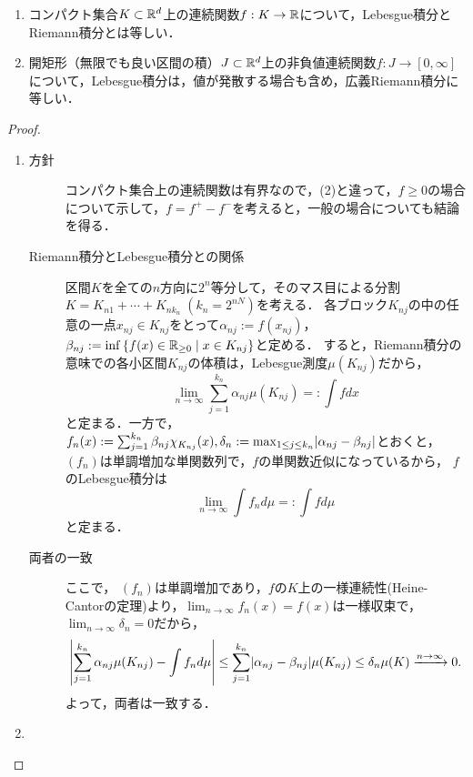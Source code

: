\documentclass[uplatex, dvipdfmx]{jsreport}
\begin{document}
\begin{theorem}[連続関数の積分]\mbox{}\label{thm-Lebesgue-integral-of-continuous-function}
    \begin{enumerate}
        \item コンパクト集合$K\subset\mathbb{R}^d$上の連続関数$f:K\to\mathbb{R}$について，Lebesgue積分とRiemann積分とは等しい．
        \item 開矩形（無限でも良い区間の積）$J\subset\mathbb{R}^d$上の非負値連続関数$f:J\to[0,\infty]$について，Lebesgue積分は，値が発散する場合も含め，広義Riemann積分に等しい．
    \end{enumerate}
\end{theorem}
\begin{proof}\mbox{}
    \begin{enumerate}
        \item \begin{description}
            \item[方針] コンパクト集合上の連続関数は有界なので，(2)と違って，$f\ge 0$の場合について示して，$f=f^+-f^-$を考えると，一般の場合についても結論を得る．
            \item[Riemann積分とLebesgue積分との関係]
            区間$K$を全ての$n$方向に$2^n$等分して，そのマス目による分割$K=K_{n1}+\cdots+K_{nk_n}\;(k_n=2^{nN})$を考える．
            各ブロック$K_{nj}$の中の任意の一点$x_{nj}\in K_{nj}$をとって$\alpha_{nj}:=f(x_{nj})$，$\beta_{nj}:=\inf\left\{f(x)\in\mathbb{R}_{\ge0}\mid x\in K_{nj}\right\}$と定める．
            すると，Riemann積分の意味での各小区間$K_{nj}$の体積は，Lebesgue測度$\mu(K_{nj})$だから，
            \[\lim_{n\to\infty}\sum_{j=1}^{k_n}\alpha_{nj}\mu(K_{nj})=:\int fdx\]
            と定まる．一方で，
            $f_n(x):=\sum_{j=1}^{k_n}\beta_{nj}\chi_{K_{nj}}(x),\delta_n:=\max_{1\le j\le k_n}\lvert\alpha_{nj}-\beta_{nj}\rvert$とおくと，
            $(f_n)$は単調増加な単関数列で，$f$の単関数近似になっているから，
            $f$のLebesgue積分は
            \[\lim_{n\to\infty}\int f_nd\mu=:\int fd\mu\]
            と定まる．
            \item[両者の一致]
            ここで，
            $(f_n)$は単調増加であり，$f$の$K$上の一様連続性(Heine-Cantorの定理)より，$\lim_{n\to\infty}f_n(x)=f(x)$は一様収束で，$\lim_{n\to\infty}\delta_n=0$だから，
            \[\left|\sum_{j=1}^{k_n}\alpha_{nj}\mu(K_{nj})-\int f_nd\mu\right|\le\sum_{j=1}^{k_n}\lvert\alpha_{nj}-\beta_{nj}\rvert\mu(K_{nj})\le\delta_n\mu(K)\xrightarrow{n\to\infty}0.\]
            よって，両者は一致する．
        \end{description}
        \item \begin{description}

\end{description}
\end{enumerate}
\end{proof}
\end{document}
